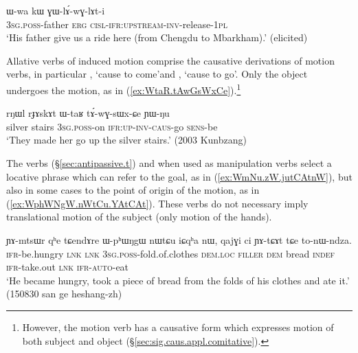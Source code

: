 \begin{exe}
\ex \label{ex:GWlAwGlAti}
\gll  ɯ-wa kɯ ɣɯ-lɤ́-wɣ-lɤt-i \\
\textsc{3sg}.\textsc{poss}-father \textsc{erg} \textsc{cisl}-\textsc{ifr}:\textsc{upstream}-\textsc{inv}-release-\textsc{1pl} \\
\glt `His father give us a ride here (from Chengdu to Mbarkham).' (elicited)
\end{exe}

Allative verbs of induced motion comprise the causative derivations of motion verbs, in particular , `cause to come'and , `cause to go'. Only the object undergoes the motion, as in (\ref{ex:WtaR.tAwGsWxCe}).\footnote{However, the motion verb  has a causative form  which expresses motion of both subject and object (§\ref{sec:sig.caus.appl.comitative}). }

\begin{exe}
\ex \label{ex:WtaR.tAwGsWxCe}
\gll rŋɯl rɟɤskɤt ɯ-taʁ tɤ́-wɣ-sɯx-ɕe ɲɯ-ŋu \\
silver stairs \textsc{3sg}.\textsc{poss}-on \textsc{ifr}:\textsc{up}-\textsc{inv}-\textsc{caus}-go \textsc{sens}-be \\
\glt `They made her go up the silver stairs.' (2003 Kunbzang)
\end{exe}


The verbs  (§\ref{sec:antipassive.t}) and  when used as manipulation verbs select a locative phrase which can refer to the goal, as in (\ref{ex:WmNu.zW.jutCAtnW}), but also in some cases to the point of origin of the motion, as in (\ref{ex:WphWNgW.nWtCu.YAtCAt}). These verbs do not necessary imply translational motion of the subject (only motion of the hands).

\begin{exe}
\ex \label{ex:WphWNgW.nWtCu.YAtCAt}
\gll ɲɤ-mtsɯr qʰe tɕendɤre ɯ-pʰɯŋgɯ nɯtɕu iɕqʰa nɯ, qajɣi ci ɲɤ-tɕɤt tɕe to-nɯ-ndza. \\
\textsc{ifr}-be.hungry \textsc{lnk} \textsc{lnk} \textsc{3sg}.\textsc{poss}-fold.of.clothes \textsc{dem}.\textsc{loc} \textsc{filler} \textsc{dem} bread \textsc{indef} \textsc{ifr}-take.out \textsc{lnk} \textsc{ifr}-\textsc{auto}-eat \\
\glt `He became hungry, took a piece of bread from the folds of his clothes and ate it.' (150830 san ge heshang-zh) 
\end{exe}

